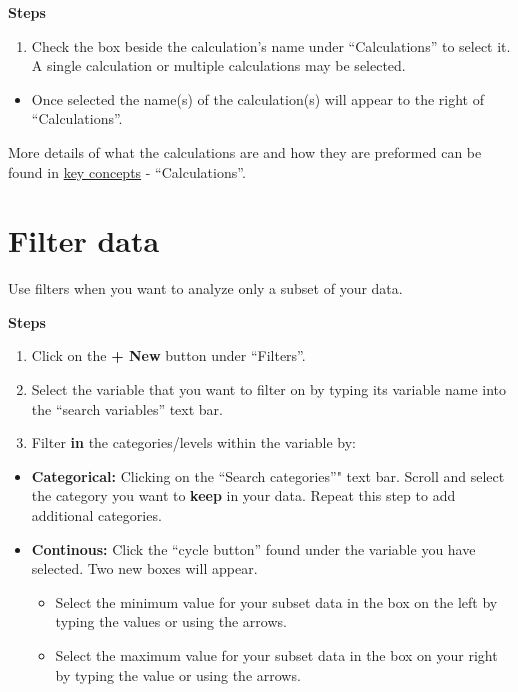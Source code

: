 \documentclass[]{book}
\providecommand{\tightlist}{%
  \setlength{\itemsep}{0pt}\setlength{\parskip}{0pt}}
\begin{document}
\textbf{Steps}

\begin{enumerate}
\def\labelenumi{\arabic{enumi}.}
\tightlist
\item
  Check the box beside the calculation's name under ``Calculations'' to select it. A single calculation or multiple calculations may be selected.
\end{enumerate}

\begin{itemize}
\tightlist
\item
  Once selected the name(s) of the calculation(s) will appear to the right of ``Calculations''.
\end{itemize}

More details of what the calculations are and how they are preformed can be found in \protect\hyperlink{keyconcepts}{key concepts} - ``Calculations''.

\hypertarget{filter-data}{%
\section{Filter data}\label{filter-data}}

Use filters when you want to analyze only a subset of your data.

\textbf{Steps}

\begin{enumerate}
\def\labelenumi{\arabic{enumi}.}
\item
  Click on the \textbf{+ New} button under ``Filters''.
\item
  Select the variable that you want to filter on by typing its variable name into the ``search variables'' text bar.
\item
  Filter \textbf{in} the categories/levels within the variable by:
\end{enumerate}

\begin{itemize}
\item
  \textbf{Categorical:} Clicking on the ``Search categories''" text bar. Scroll and select the category you want to \textbf{keep} in your data. Repeat this step to add additional categories.
\item
  \textbf{Continous:} Click the ``cycle button'' found under the variable you have selected. Two new boxes will appear.

  \begin{itemize}
  \tightlist
  \item
    Select the minimum value for your subset data in the box on the left by typing the values or using the arrows.
  \item
    Select the maximum value for your subset data in the box on your right by typing the value or using the arrows.
  \end{itemize}
\end{itemize}
\end{document}
